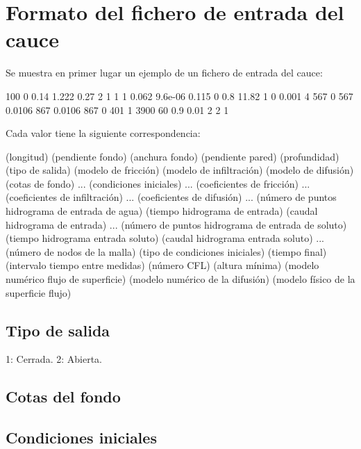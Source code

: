 \documentclass[a4paper,12pt]{report}
\begin{document}
\section{Formato del fichero de entrada del cauce}

Se muestra en primer lugar un ejemplo de un fichero de entrada del cauce:

{\footnotesize
\begin{boxedverbatim}
100 0 0.14 1.222 0.27
2
1 1 1
0.062
9.6e-06 0.115 0 0.8
11.82
1
0 0.001
4
567 0
567 0.0106
867 0.0106
867 0
401 1
3900 60 0.9 0.01
2 2
1
\end{boxedverbatim}
}

Cada valor tiene la siguiente correspondencia:

{\footnotesize
\begin{boxedverbatim}
(longitud) (pendiente fondo) (anchura fondo) (pendiente pared) (profundidad)
(tipo de salida)
(modelo de fricción) (modelo de infiltración) (modelo de difusión)
(cotas de fondo) ...
(condiciones iniciales) ...
(coeficientes de fricción) ...
(coeficientes de infiltración) ...
(coeficientes de difusión) ...
(número de puntos hidrograma de entrada de agua)
(tiempo hidrograma de entrada) (caudal hidrograma de entrada)
...
(número de puntos hidrograma de entrada de soluto)
(tiempo hidrograma entrada soluto) (caudal hidrograma entrada soluto)
...
(número de nodos de la malla) (tipo de condiciones iniciales)
(tiempo final) (intervalo tiempo entre medidas) (número CFL) (altura mínima)
(modelo numérico flujo de superficie) (modelo numérico de la difusión)
(modelo físico de la superficie flujo)
\end{boxedverbatim}
}

\subsection{Tipo de salida}

\begin{verbatimtab}
	1: Cerrada.
	2: Abierta.
\end{verbatimtab}

\subsection{Cotas del fondo}

\subsection{Condiciones iniciales}
\end{document}
